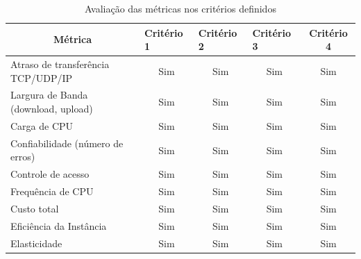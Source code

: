 \documentclass[conference]{IEEEtran}
\begin{document}
\begin{table}[]
\centering
\caption{Avaliação das métricas nos critérios definidos}
\label{tab:avaliacao_metricas}
\begin{tabular}{@{}lcccc@{}}
\toprule
\multicolumn{1}{c}{\textbf{Métrica}}              & \multicolumn{1}{l}{\textbf{Critério 1}} & \multicolumn{1}{l}{\textbf{Critério 2}} & \multicolumn{1}{l}{\textbf{Critério 3}} & \textbf{Critério 4}         \\ \midrule
Atraso de transferência TCP/UDP/IP                & Sim                                     & Sim                                     & Sim                                     & Sim                         \\
Largura de Banda (download, upload)               & Sim                                     & Sim                                     & Sim                                     & Sim                         \\
Carga de CPU                                      & Sim                                     & Sim                                     & Sim                                     & Sim                         \\
Confiabilidade (número de erros)                  & Sim                                     & Sim                                     & Sim                                     & Sim                         \\
Controle de acesso                                & Sim                                     & Sim                                     & Sim                                     & Sim                         \\
Frequência de CPU                                 & Sim                                     & Sim                                     & Sim                                     & Sim                         \\
Custo total                                       & Sim                                     & Sim                                     & Sim                                     & Sim                         \\
Eficiência da Instância                           & Sim                                     & Sim                                     & Sim                                     & Sim                         \\
Elasticidade                                      & Sim                                     & Sim                                     & Sim                                     & Sim                         \\

\end{tabular}
\end{table}
\end{document}
